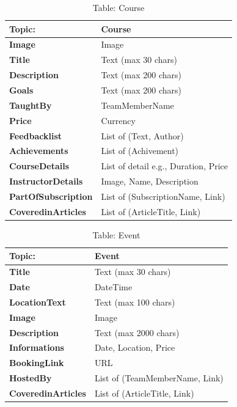 \begin{table}[H]
\centering
\begin{tabularx}{\textwidth}{|>{\bfseries}l|X|}
\hline
Topic: & \textbf{Course} \\
\hline
Image & Image \\
\hline
Title & Text (max 30 chars) \\
\hline
Description & Text (max 200 chars) \\
\hline
Goals & Text (max 200 chars) \\
\hline
TaughtBy & TeamMemberName \\
\hline
Price & Currency \\
\hline
Feedbacklist & List of (Text, Author) \\
\hline
Achievements & List of (Achivement) \\
\hline
CourseDetails & List of detail e.g., Duration, Price \\
\hline
InstructorDetails & Image, Name, Description \\
\hline
PartOfSubscription & List of (SubscriptionName, Link) \\
\hline
CoveredinArticles & List of (ArticleTitle, Link) \\
\hline
\end{tabularx}
\caption{Table: Course}
\end{table}

\begin{table}[H]
\centering
\begin{tabularx}{\textwidth}{|>{\bfseries}l|X|}
\hline
Topic: & \textbf{Event} \\
\hline
Title & Text (max 30 chars) \\
\hline
Date & DateTime \\
\hline
LocationText & Text (max 100 chars) \\
\hline
Image & Image \\
\hline
Description & Text (max 2000 chars) \\
\hline
Informations & Date, Location, Price \\
\hline
BookingLink & URL \\
\hline
HostedBy & List of (TeamMemberName, Link) \\
\hline
CoveredinArticles & List of (ArticleTitle, Link) \\
\hline
\end{tabularx}
\caption{Table: Event}
\end{table}

